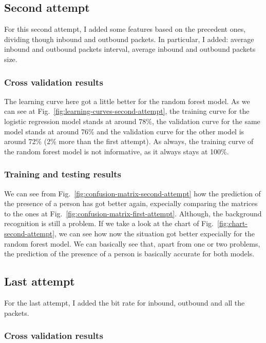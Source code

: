 \subsection{Second attempt}
For this second attempt, I added some features based on the precedent ones, dividing though inbound and outbound packets. In particular, I added: average inbound and outbound packets interval, average inbound and outbound packets size.

\subsubsection{Cross validation results}


The learning curve here got a little better for the random forest model. As we can see at Fig.~\ref{fig:learning-curves-second-attempt}, the training curve for the logistic regression model stands at around 78\%, the validation curve for the same model stands at around 76\% and the validation curve for the other model is around 72\% (2\% more than the first attempt). As always, the training curve of the random forest model is not informative, as it always stays at 100\%.

\subsubsection{Training and testing results}

We can see from Fig.~\ref{fig:confusion-matrix-second-attempt} how the prediction of the presence of a person has got better again, expecially comparing the matrices to the ones at Fig.~\ref{fig:confusion-matrix-first-attempt}. Although, the background recognition is still a problem. If we take a look at the chart of Fig.~\ref{fig:chart-second-attempt}, we can see how now the situation got better expecially for the random forest model. We can basically see that, apart from one or two problems, the prediction of the presence of a person is basically accurate for both models.

\subsection{Last attempt}
For the last attempt, I added the bit rate for inbound, outbound and all the packets.

\subsubsection{Cross validation results}

